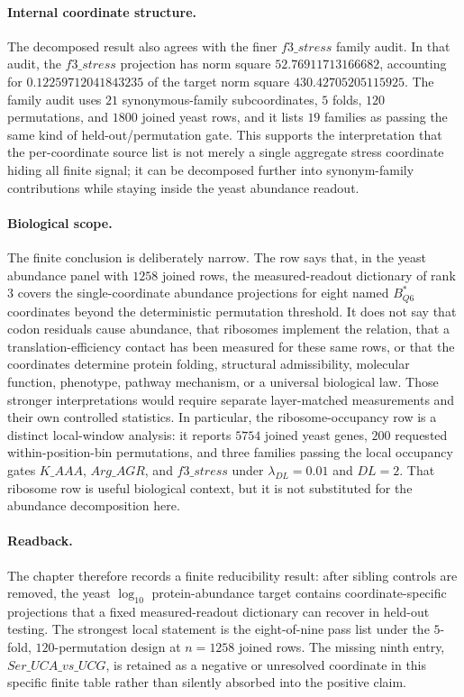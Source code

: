 \paragraph{Internal coordinate structure.}  The decomposed result also agrees with the finer $f3\_stress$ family audit.  In that audit, the $f3\_stress$ projection has norm square $52.76911713166682$, accounting for $0.12259712041843235$ of the target norm square $430.42705205115925$.  The family audit uses $21$ synonymous-family subcoordinates, $5$ folds, $120$ permutations, and $1800$ joined yeast rows, and it lists $19$ families as passing the same kind of held-out/permutation gate.  This supports the interpretation that the per-coordinate source list is not merely a single aggregate stress coordinate hiding all finite signal; it can be decomposed further into synonym-family contributions while staying inside the yeast abundance readout.

\paragraph{Biological scope.}  The finite conclusion is deliberately narrow.  The row says that, in the yeast abundance panel with $1258$ joined rows, the measured-readout dictionary of rank $3$ covers the single-coordinate abundance projections for eight named $B^\ast_{Q6}$ coordinates beyond the deterministic permutation threshold.  It does not say that codon residuals cause abundance, that ribosomes implement the relation, that a translation-efficiency contact has been measured for these same rows, or that the coordinates determine protein folding, structural admissibility, molecular function, phenotype, pathway mechanism, or a universal biological law.  Those stronger interpretations would require separate layer-matched measurements and their own controlled statistics.  In particular, the ribosome-occupancy row is a distinct local-window analysis: it reports $5754$ joined yeast genes, $200$ requested within-position-bin permutations, and three families passing the local occupancy gates $K\_AAA$, $Arg\_AGR$, and $f3\_stress$ under $\lambda_{DL}=0.01$ and $DL=2$.  That ribosome row is useful biological context, but it is not substituted for the abundance decomposition here.

\paragraph{Readback.}  The chapter therefore records a finite reducibility result: after sibling controls are removed, the yeast $\log_{10}$ protein-abundance target contains coordinate-specific projections that a fixed measured-readout dictionary can recover in held-out testing.  The strongest local statement is the eight-of-nine pass list under the $5$-fold, $120$-permutation design at $n=1258$ joined rows.  The missing ninth entry, $Ser\_UCA\_vs\_UCG$, is retained as a negative or unresolved coordinate in this specific finite table rather than silently absorbed into the positive claim.
